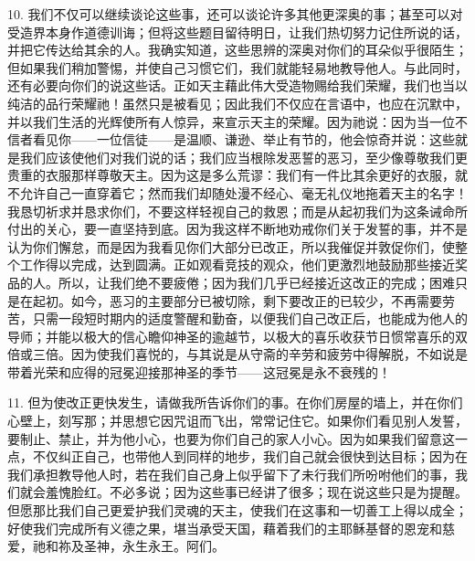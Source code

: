 10. 我们不仅可以继续谈论这些事，还可以谈论许多其他更深奥的事；甚至可以对受造界本身作道德训诲；但将这些题目留待明日，让我们热切努力记住所说的话，并把它传达给其余的人。我确实知道，这些思辨的深奥对你们的耳朵似乎很陌生；但如果我们稍加警惕，并使自己习惯它们，我们就能轻易地教导他人。与此同时，还有必要向你们的说这些话。正如天主藉此伟大受造物赐给我们荣耀，我们也当以纯洁的品行荣耀祂！虽然只是被看见；因此我们不仅应在言语中，也应在沉默中，并以我们生活的光辉使所有人惊异，来宣示天主的荣耀。因为祂说：因为当一位不信者看见你——一位信徒——是温顺、谦逊、举止有节的，他会惊奇并说：这些就是我们应该使他们对我们说的话；我们应当根除发恶誓的恶习，至少像尊敬我们更贵重的衣服那样尊敬天主。因为这是多么荒谬：我们有一件比其余更好的衣服，就不允许自己一直穿着它；然而我们却随处漫不经心、毫无礼仪地拖着天主的名字！我恳切祈求并恳求你们，不要这样轻视自己的救恩；而是从起初我们为这条诫命所付出的关心，要一直坚持到底。因为我这样不断地劝戒你们关于发誓的事，并不是认为你们懈怠，而是因为我看见你们大部分已改正，所以我催促并敦促你们，使整个工作得以完成，达到圆满。正如观看竞技的观众，他们更激烈地鼓励那些接近奖品的人。所以，让我们绝不要疲倦；因为我们几乎已经接近这改正的完成；困难只是在起初。如今，恶习的主要部分已被切除，剩下要改正的已较少，不再需要劳苦，只需一段短时期内的适度警醒和勤奋，以便我们自己改正后，也能成为他人的导师；并能以极大的信心瞻仰神圣的逾越节，以极大的喜乐收获节日惯常喜乐的双倍或三倍。因为使我们喜悦的，与其说是从守斋的辛劳和疲劳中得解脱，不如说是带着光荣和应得的冠冕迎接那神圣的季节——这冠冕是永不衰残的！\par

11. 但为使改正更快发生，请做我所告诉你们的事。在你们房屋的墙上，并在你们心壁上，刻写那；并思想它因咒诅而飞出，常常记住它。如果你们看见别人发誓，要制止、禁止，并为他小心，也要为你们自己的家人小心。因为如果我们留意这一点，不仅纠正自己，也带他人到同样的地步，我们自己就会很快到达目标；因为在我们承担教导他人时，若在我们自己身上似乎留下了未行我们所吩咐他们的事，我们就会羞愧脸红。不必多说；因为这些事已经讲了很多；现在说这些只是为提醒。但愿那比我们自己更爱护我们灵魂的天主，使我们在这事和一切善工上得以成全；好使我们完成所有义德之果，堪当承受天国，藉着我们的主耶稣基督的恩宠和慈爱，祂和祢及圣神，永生永王。阿们。\par

